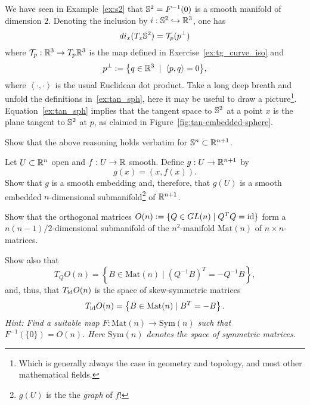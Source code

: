 \begin{example}
  We have seen in Example~\ref{ex:s2} that $\mathbb{S}^2 = F^{-1}(0)$ is a smooth manifold of dimension $2$.
  Denoting the inclusion by $i:\mathbb{S}^2 \hookrightarrow\mathbb{R}^3$, one has
  \begin{equation}\label{ex:tan_sph}
    di_x(T_x\mathbb{S}^2) = \mathcal{T}_p(p^\perp)
  \end{equation}
  where $\mathcal{T}_p:\mathbb{R}^3\to T_p\mathbb{R}^3$ is the map defined in Exercise~\ref{ex:tg_curve_iso} and
  \begin{equation}
    p^\perp := \big\{q\in\mathbb{R}^3 \;\mid\; \left\langle p, q\right\rangle = 0\big\},
  \end{equation}
  where $\left\langle\cdot,\cdot\right\rangle$ is the usual Euclidean dot product.
  Take a long deep breath and unfold the definitions in~\eqref{ex:tan_sph}, here it may be useful to draw a picture\footnote{Which is generally always the case in geometry and topology, and most other mathematical fields.}. 
  Equation~\eqref{ex:tan_sph} implies that the tangent space to $\mathbb{S}^2$ at a point $x$  is the plane tangent to $\mathbb{S}^2$ at $p$, as claimed in Figure~\ref{fig:tan-embedded-sphere}.
\end{example}

\begin{exercise}
  Show that the above reasoning holds verbatim for $\mathbb{S}^n\subset\mathbb{R}^{n+1}$.
\end{exercise}

\begin{exercise}
  Let $U\subset\mathbb{R}^n$ open and $f:U\to\mathbb{R}$ smooth.
  Define $g:U\to\mathbb{R}^{n+1}$ by
  \begin{equation}
    g(x) = (x, f(x)).
  \end{equation} 
  Show that $g$ is a smooth embedding and, therefore, that $g(U)$ is a smooth embedded $n$-dimensional submanifold\footnote{$g(U)$ is the the \emph{graph} of $f$!} of $\mathbb{R}^{n+1}$.
\end{exercise}

\begin{exercise}[\textit{[homework 2]}]\label{exe:onsubmanifold}
  Show that the orthogonal matrices $O(n) := \{ Q\in GL(n) \mid Q^TQ=\operatorname{id} \}$ form a $n(n-1)/2$-dimensional submanifold of the $n^2$-manifold $\mathrm{Mat}(n)$ of $n\times n$-matrices.

  Show also that
  \begin{equation}
    T_Q O(n) = \left\lbrace B \in \mathrm{Mat}(n) \mid (Q^{-1} B)^T = -Q^{-1}B \right\rbrace,
  \end{equation}
  and, thus, that $T_{\operatorname{id}} O(n)$ is the space of skew-symmetric matrices
  \begin{equation}
    T_{\operatorname{id}} O(n) = \left\{ B \in \mathrm{Mat}(n) \mid B^T = -B \right\}.
  \end{equation}
  \textit{\small Hint: Find a suitable map $F: \mathrm{Mat}(n) \to \mathrm{Sym}(n)$ such that $F^{-1}(\{0\}) = O(n)$. Here $\mathrm{Sym}(n)$ denotes the space of symmetric matrices.}
\end{exercise}
